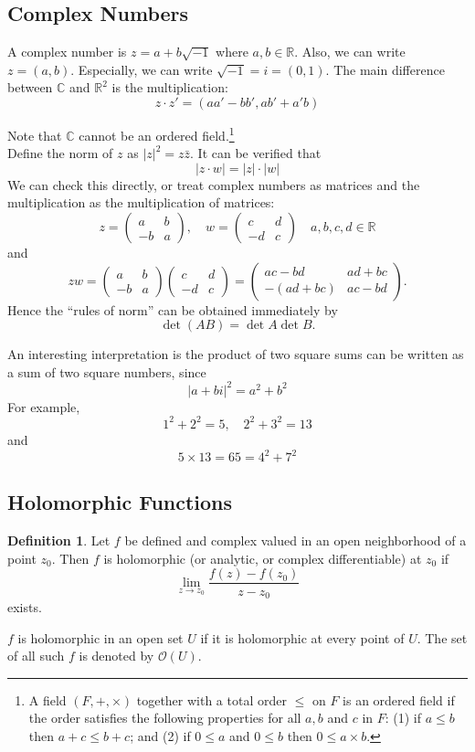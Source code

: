\documentclass[12pt,reqno]{article}
\newcommand{\R}{\mathbb{R}}
\newcommand{\CC}{\mathbb{C}}
\newcommand{\OO}{\mathcal{O}}
\theoremstyle{definition}
\newtheorem{definition}[theorem]{Definition}
\begin{document}
 
\subsection{Complex Numbers}
A complex number is $z=a+b\sqrt{-1}$ where $a,b\in \R$. Also, we can write $z=(a,b)$. Especially, we can write $\sqrt{-1}=i=(0,1)$. The main difference between $\CC$ and $\R^2$ is the multiplication:
\[z\cdot z'=(aa'-bb',ab'+a'b) \]

Note that $\CC$ cannot be an ordered field.\footnote{A field $(F,+, \times)$ together with a total order $\leq$ on $F$ is an ordered field if the order satisfies the following properties for all $a, b$ and $c$ in $F$: (1) if $a \leq b$ then $a + c \leq b + c$; and (2)
if $0 \leq a$ and $0 \leq b$ then $0 \leq a \times b$.} \\

Define the norm of $z$ as $|z|^2=z\bar{z}$. It can be verified that 
\[|z\cdot w|=|z|\cdot|w|\]
We can check this directly, or treat complex numbers as matrices and the multiplication as the multiplication of matrices:
\[z=\begin{pmatrix}a&b\\-b&a\end{pmatrix},\quad w=\begin{pmatrix}c&d\\-d&c\end{pmatrix}\quad a,b,c,d\in \R\]
and 
\[zw=\begin{pmatrix}a&b\\-b&a\end{pmatrix}\begin{pmatrix}c&d\\-d&c\end{pmatrix}=\begin{pmatrix}ac-bd&ad+bc\\-(ad+bc)&ac-bd\end{pmatrix}.\]
Hence the ``rules of norm'' can be obtained immediately by
\[\det (AB)=\det A \det B.\]

An interesting interpretation is the product of two square sums can be written as a sum of two square numbers, since 
\[|a+bi|^2=a^2+b^2\]
For example,
\[1^2+2^2=5,\quad 2^2+3^2=13 \]
and 
\[5\times 13=65=4^2+7^2\]

\subsection{Holomorphic Functions}
\begin{definition}
Let $f$ be defined and complex valued in an open neighborhood of a point $z_0$. Then $f$ is holomorphic (or analytic, or complex differentiable) at $z_0$ if 
\[\lim_{z\to z_0}\frac{f(z)-f(z_0)}{z-z_0}\]
exists.\par
$f$ is holomorphic in an open set $U$ if it is holomorphic at every point of $U$. The set of all such $f$ is denoted by $\OO(U)$.
\end{definition}
\end{document}
